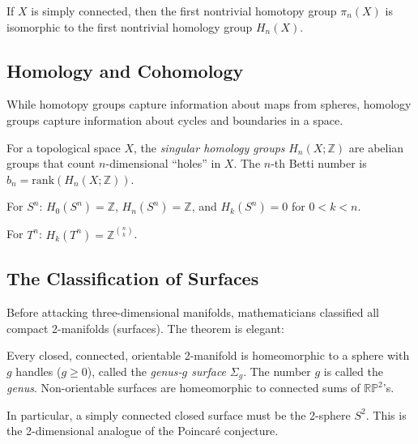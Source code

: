 \begin{theorem}
If $X$ is simply connected, then the first nontrivial homotopy group $\pi_n(X)$ is isomorphic to the first nontrivial homology group $H_n(X)$.
\end{theorem}

\subsection{Homology and Cohomology}

While homotopy groups capture information about maps from spheres, homology groups capture information about cycles and boundaries in a space.

\begin{definition}
For a topological space $X$, the \textit{singular homology groups} $H_n(X; \mathbb{Z})$ are abelian groups that count $n$-dimensional ``holes'' in $X$. The $n$-th Betti number is $b_n = \mathrm{rank}(H_n(X; \mathbb{Z}))$.
\end{definition}

\begin{example}
For $S^n$: $H_0(S^n) = \mathbb{Z}$, $H_n(S^n) = \mathbb{Z}$, and $H_k(S^n) = 0$ for $0 < k < n$.
\end{example}

\begin{example}
For $T^n$: $H_k(T^n) = \mathbb{Z}^{\binom{n}{k}}$.
\end{example}

\subsection{The Classification of Surfaces}

Before attacking three-dimensional manifolds, mathematicians classified all compact 2-manifolds (surfaces). The theorem is elegant:

\begin{theorem}
Every closed, connected, orientable 2-manifold is homeomorphic to a sphere with $g$ handles ($g \ge 0$), called the \textit{genus-$g$ surface} $\Sigma_g$. The number $g$ is called the \textit{genus}. Non-orientable surfaces are homeomorphic to connected sums of $\mathbb{RP}^2$'s.
\end{theorem}

In particular, a simply connected closed surface must be the 2-sphere $S^2$. This is the 2-dimensional analogue of the Poincar\'{e} conjecture.

